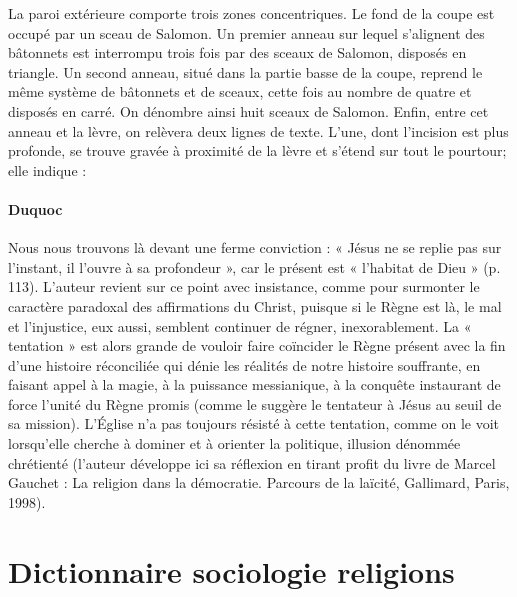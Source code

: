La paroi extérieure comporte trois zones concentriques. Le fond de la coupe est occupé par un sceau de Salomon. Un premier anneau sur lequel s'alignent des bâtonnets est interrompu trois fois par des sceaux de Salomon, disposés en triangle. Un second anneau, situé dans la partie basse de la coupe, reprend le même système de bâtonnets et de sceaux, cette fois au nombre de quatre et disposés en carré. On dénombre ainsi huit sceaux de Salomon. Enfin, entre cet anneau et la lèvre, on relèvera deux lignes de texte. L'une, dont l'incision est plus profonde, se trouve gravée à proximité de la lèvre et s'étend sur tout le pourtour; elle indique :
 


\paragraph{Duquoc} Nous nous trouvons là devant une ferme conviction : « Jésus ne se replie pas sur l’instant, il l’ouvre à sa profondeur », car le présent est « l’habitat de Dieu » (p. 113). L’auteur revient sur ce point avec insistance, comme pour surmonter le caractère paradoxal des affirmations du Christ, puisque si le Règne est là, le mal et l’injustice, eux aussi, semblent continuer de régner, inexorablement. La « tentation » est alors grande de vouloir faire coïncider le Règne présent avec la fin d’une histoire réconciliée qui dénie les réalités de notre histoire souffrante, en faisant appel à la magie, à la puissance messianique, à la conquête instaurant de force l’unité du Règne promis (comme le suggère le tentateur à Jésus au seuil de sa mission). L’Église n’a pas toujours résisté à cette tentation, comme on le voit lorsqu’elle cherche à dominer et à orienter la politique, illusion dénommée chrétienté (l’auteur développe ici sa réflexion en tirant profit du livre de Marcel Gauchet : La religion dans la démocratie. Parcours de la laïcité, Gallimard, Paris, 1998).  

\section{Dictionnaire sociologie religions}

